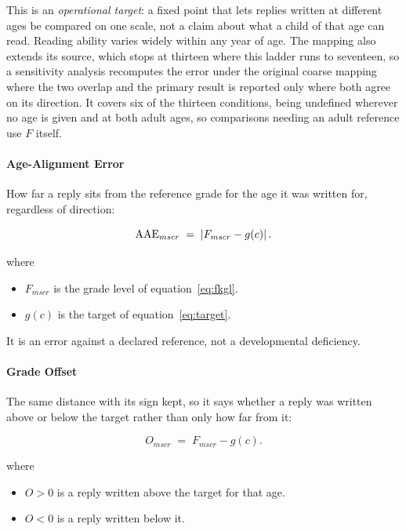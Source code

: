 This is an \emph{operational target}: a fixed point that lets replies written at
different ages be compared on one scale, not a claim about what a child of that
age can read. Reading ability varies widely within any year of age. The mapping
also extends its source, which stops at thirteen where this ladder runs to
seventeen, so a sensitivity analysis recomputes the error under the original
coarse mapping where the two overlap and the primary result is reported only
where both agree on its direction. It covers six of the thirteen conditions,
being undefined wherever no age is given and at both adult ages, so comparisons
needing an adult reference use $F$ itself.

\paragraph{Age-Alignment Error} How far a reply sits from the reference grade for
the age it was written for, regardless of direction:

\begin{equation}
\label{eq:aae}
\mathrm{AAE}_{mscr} \;=\; \left| F_{mscr} - g(c) \right| .
\end{equation}

where

\begin{itemize}[itemsep=1pt]
  \item $F_{mscr}$ is the grade level of equation~\eqref{eq:fkgl}.
  \item $g(c)$ is the target of equation~\eqref{eq:target}.
\end{itemize}

It is an error against a declared reference, not a developmental deficiency.

\paragraph{Grade Offset} The same distance with its sign kept, so it says whether
a reply was written above or below the target rather than only how far from it:

\begin{equation}
\label{eq:offset}
O_{mscr} \;=\; F_{mscr} - g(c) .
\end{equation}

where

\begin{itemize}[itemsep=1pt]
  \item $O > 0$ is a reply written above the target for that age.
  \item $O < 0$ is a reply written below it.
\end{itemize}


